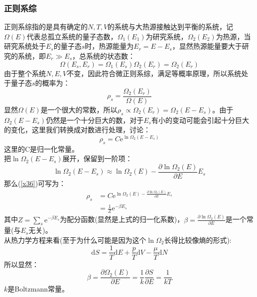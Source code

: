 \documentclass[12pt]{article}
\begin{document}
\subsubsection{正则系综}
正则系综指的是具有确定的$N, T, V$的系统与大热源接触达到平衡的系统，记$\Omega(E)$代表总孤立系统的量子态数，$\Omega_1(E_1)$为研究系统，$\Omega_2(E_2)$为热源，当研究系统处于$E_s$的量子态$s$时，热源能量为$E_r=E-E_s$，显然热源能量要大于研究的系统，即$E_r\gg E_s$，总系统的状态数：
\begin{equation}
	\Omega(E_s,E_r)=\Omega_1(E_s)\Omega_2(E_r)=\Omega_2(E_r)
\end{equation}
由于整个系统$N, E, V$不变，因此符合微正则系综，满足等概率原理，所以系统处于量子态$s$的概率为：
\begin{equation}
	\rho_s=\frac{\Omega_2(E_r)}{\Omega(E)}
\end{equation}
显然$\Omega(E)$是一个很大的常数，所以$\rho_s\propto \Omega_2(E_r)=\Omega_2(E-E_s)$。由于$\Omega_2(E-E_s)$仍然是一个十分巨大的数，对于$E_s$有小的变动可能会引起十分巨大的变化，这里我们转换成对数进行处理，讨论：
\begin{equation}
	\rho_s=C\mathrm{e}^{\ln \Omega_2(E-E_s)}
	\label{x36}
\end{equation}
这里的C是归一化常量。\\
把$\ln \Omega_2(E-E_s)$展开，保留到一阶项：
\begin{equation}
	\ln \Omega_2(E-E_s)\approx \ln \Omega_2(E)-\frac{\partial \ln \Omega_2(E)}{\partial E}E_s
\end{equation}
那么(\ref{x36})可写为：
\begin{equation}
	\begin{split}
	\rho_s&=C\mathrm{e}^{\ln \Omega_2(E)-\frac{\partial \ln \Omega_2(E)}{\partial E}E_s}\\
	&=\frac{1}{Z}\mathrm{e}^{-\beta E_s}
	\label{x51}
\end{split}
\end{equation}
其中$Z=\sum_s \mathrm{e}^{-\beta E_s}$为配分函数(显然是上式的归一化系数)，$\beta=\frac{\partial \ln \Omega_2(E)}{\partial E}$是一个常量(与$E_s$无关)。\\
从热力学方程来看(至于为什么可能是因为这个$\ln \Omega_2$长得比较像熵的形式):
\begin{equation}
	\mathrm{d}S=\frac{1}{T}\mathrm{d}E+\frac{p}{T}\mathrm{d}V-\frac{\mu}{T}\mathrm{d}N
\end{equation}
所以显然：
\begin{equation}
	\beta=\frac{\partial \Omega_2(E)}{\partial E}=\frac{1}{k}\frac{\partial S}{\partial E}=\frac{1}{kT}
\end{equation}
$k$是Boltzmann常量。
\end{document}

